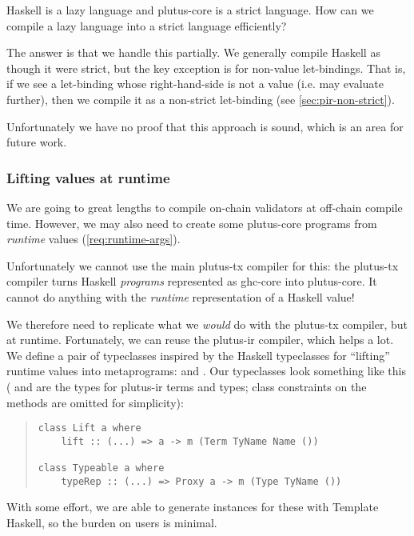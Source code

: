 Haskell is a lazy language and \gls{plutus-core} is a strict language.
How can we compile a lazy language into a strict language efficiently?

The answer is that we handle this partially.
We generally compile Haskell as though it were strict, but the key exception is for non-value let-bindings.
That is, if we see a let-binding whose right-hand-side is not a value (i.e. may evaluate further), then we compile it as a non-strict let-binding (see \cref{sec:pir-non-strict}).

Unfortunately we have no proof that this approach is sound, which is an area for future work.

\subsubsection{Lifting values at runtime}
\label{sec:plutus-tx-lifting}

We are going to great lengths to compile \gls{on-chain} \glspl{validator} at \gls{off-chain} compile time.
However, we may also need to create some \gls{plutus-core} programs from \emph{runtime} values (\cref{req:runtime-args}).

Unfortunately we cannot use the main \gls{plutus-tx} compiler for this: the \gls{plutus-tx} compiler turns Haskell \emph{programs} represented as \gls{ghc-core} into \gls{plutus-core}.
It cannot do anything with the \emph{runtime} representation of a Haskell value!

We therefore need to replicate what we \emph{would} do with the \gls{plutus-tx} compiler, but at runtime.
Fortunately, we can reuse the \gls{plutus-ir} compiler, which helps a lot.
We define a pair of typeclasses inspired by the Haskell typeclasses for ``lifting'' runtime values into metaprograms:  and .
Our typeclasses look something like this ( and  are the types for \gls{plutus-ir} terms and types; class constraints on the methods are omitted for simplicity):

\begin{quote}
\begin{verbatim}
class Lift a where
    lift :: (...) => a -> m (Term TyName Name ())

class Typeable a where
    typeRep :: (...) => Proxy a -> m (Type TyName ())
\end{verbatim}
\end{quote}

With some effort, we are able to generate instances for these with Template Haskell, so the burden on users is minimal.

